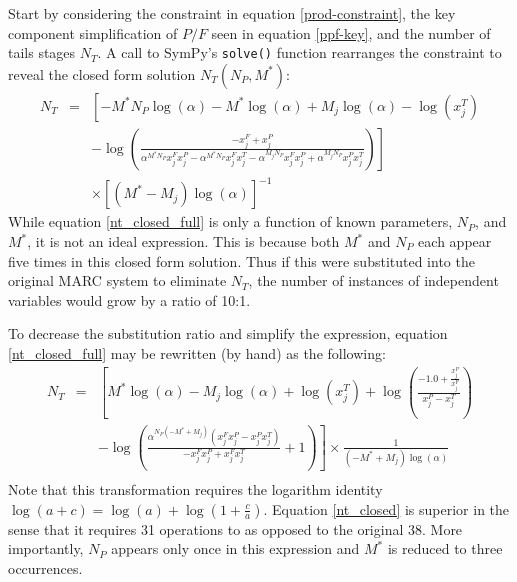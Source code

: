 \documentclass[preprint,12pt]{elsarticle}
\begin{document}
Start by considering the constraint in equation \ref{prod-constraint}, the key 
component simplification of $P/F$ seen in equation \ref{ppf-key}, and the number
of tails stages $N_T$.  A call to SymPy's \texttt{solve()} function rearranges the 
constraint to reveal the closed form solution $N_T(N_P, M^*)$:
\begin{equation}
\begin{array}{lcl}
N_T & = & \left[- M^{*} N_{P} \log{\left (\alpha \right )} - M^{*} \log{\left (\alpha \right )} + M_{j} \log{\left (\alpha \right )} - \log{\left (x^{T}_{j} \right )} \right. \\ 
& & \left. - \log{\left (\frac{- x^{F}_{j} + x^{P}_{j}}{\alpha^{M^{*} N_{P}} x^{F}_{j} x^{P}_{j} - \alpha^{M^{*} N_{P}}x^{F}_{j} x^{T}_{j} - \alpha^{M_{j} N_{P}} x^{F}_{j} x^{P}_{j} + \alpha^{M_{j} N_{P}} x^{P}_{j} x^{T}_{j}} \right )} \right] \\
& & \times \left[\left(M^{*} - M_{j}\right) \log{\left (\alpha \right )} \right]^{-1}
\end{array}
\label{nt_closed_full}
\end{equation}
While equation \ref{nt_closed_full} is only a function of known 
parameters, $N_P$, and $M^*$, it is not an ideal expression.  This is because both 
$M^*$ and $N_P$ each appear five times in this closed form solution.  Thus if this 
were substituted into the original MARC system to eliminate $N_T$, the number of 
instances of independent variables would grow by a ratio of 10:1.    

To decrease the substitution ratio and simplify the expression, equation 
\ref{nt_closed_full} may be rewritten (by hand) as the following:
\begin{equation}
\begin{array}{lcl}
N_T & = & \left[M^{*} \log{\left (\alpha \right )} - M_{j} \log{\left (\alpha \right )} + \log{\left (x^{T}_{j} \right )} + \log{\left (\frac{-1.0 + \frac{x^{P}_{j}}{x^{F}_{j}}}{x^{P}_{j} - x^{T}_{j}} \right )}  \right. \\
& & \left. - \log{\left (\frac{\alpha^{N_{P} \left(- M^{*} + M_{j}\right)} \left(x^{F}_{j} x^{P}_{j} - x^{P}_{j} x^{T}_{j}\right)}{- x^{F}_{j} x^{P}_{j} + x^{F}_{j} x^{T}_{j}} + 1 \right )}\right] \times \frac{1}{\left(- M^{*} + M_{j}\right) \log{\left (\alpha \right )}} \\
\end{array}
\label{nt_closed}
\end{equation}
Note that this transformation requires the logarithm identity 
$\log(a+c) = \log(a) + \log(1 + \frac{c}{a})$.  Equation \ref{nt_closed} is superior
in the sense that it requires 31 operations to as opposed to the original 38.
More importantly, $N_P$ appears only once in this 
expression and $M^*$ is reduced to three occurrences.
\end{document}
